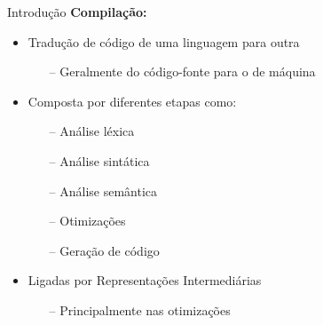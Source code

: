 \begin{frame}{Introdução}
    \textbf{Compilação:}
    \begin{itemize}
        \item Tradução de código de uma linguagem para outra
              \begin{itemize}
                  \item[--] Geralmente do código-fonte para o de máquina
              \end{itemize}
        \item Composta por diferentes etapas como:
              \begin{itemize}
                  \item[--] Análise léxica
                  \item[--] Análise sintática
                  \item[--] Análise semântica
                  \item[--] Otimizações
                  \item[--] Geração de código
              \end{itemize}
        \item Ligadas por Representações Intermediárias
              \begin{itemize}
                  \item[--] Principalmente nas otimizações~\cite{PLOTKIN1975125}
              \end{itemize}
    \end{itemize}
\end{frame}

